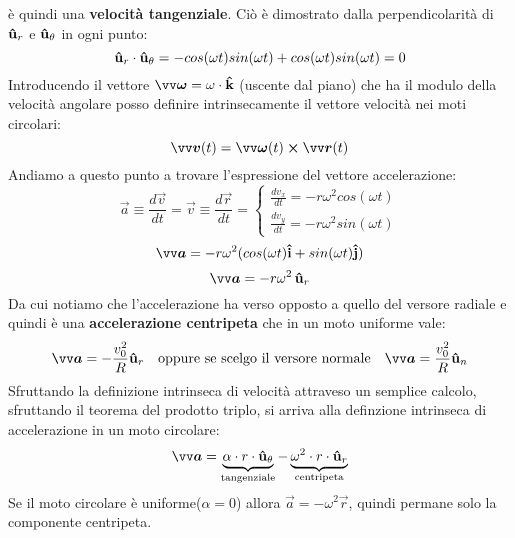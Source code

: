 è quindi una \textbf{velocità tangenziale}. Ciò è dimostrato dalla perpendicolarità di $\mathbf{\hat{u}}_r$ e $\mathbf{\hat{u}}_{\theta}$
in ogni punto:
\[
    \mathbf{\hat{u}}_r \cdot \mathbf{\hat{u}}_{\theta} = -cos(\omega t)sin (\omega t) + cos(\omega t)sin (\omega t) = 0
\]
Introducendo il vettore $\vec{\omega} = \omega \cdot \v{k}$ (uscente dal piano) che ha il modulo della velocità
angolare posso definire intrinsecamente il vettore velocità nei moti circolari:
\[
\vec{v}(t) = \vec{\omega}(t) \cross \vec{r}(t)    
\]
Andiamo a questo punto a trovare l'espressione del vettore accelerazione:
\[
\vec{a} \equiv \frac{d \vec{v}}{dt} = 
\vec{v} \equiv \frac{d \vec{r}}{dt} = 
\begin{cases}
    \frac{dv_x}{dt} = -r \omega^2 cos (\omega t) \\
    \frac{dv_y}{dt} = -r \omega^2 sin (\omega t) 
\end{cases}
\]
\[
   \vec{a} = -r \omega^2(cos(\omega t)\v{i} +sin (\omega t)\v{j}) 
\]
\[
   \vec{a} = -r \omega^2 \, \v{u}_r    
\]
Da cui notiamo che l'accelerazione ha verso opposto a quello del versore radiale e quindi è una 
\textbf{accelerazione centripeta} che in un moto uniforme vale:
\[
   \vec{a} = -\frac{v_0^2}{R}\v{u}_r \quad \text{oppure se scelgo il versore normale}  \quad
   \vec{a} = \frac{v_0^2}{R}\v{u}_n
\]
Sfruttando la definizione intrinseca di velocità attraveso un semplice calcolo, sfruttando il teorema
del prodotto triplo, si arriva alla definzione intrinseca di accelerazione in un moto circolare:
\[
  \vec{a} =\underbrace{\alpha \cdot r \cdot \v{u}_{\theta} }_{\text{tangenziale}}- \underbrace{\omega^2 
  \cdot r \cdot \v{u}_r}_{\text{centripeta}}    
\]
Se il moto circolare è uniforme($\alpha = 0$) allora $\vec{a} = - \omega^2 \vec{r}$, quindi permane
solo la componente centripeta. 


